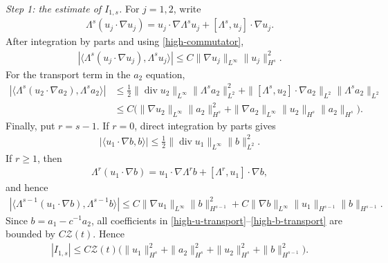 \documentclass[10pt,reqno]{amsart}
\numberwithin{equation}{section}
\begin{document}
\medskip
\noindent\emph{Step 1: the estimate of $I_{1,s}$.}
For $j=1,2$, write
\begin{align*}
\Lambda^s(u_j\cdot\nabla u_j)
=u_j\cdot\nabla\Lambda^su_j+[\Lambda^s,u_j]\cdot\nabla u_j.
\end{align*}
After integration by parts and using \eqref{high-commutator},
\begin{align}\label{high-u-transport}
\left|\langle\Lambda^s(u_j\cdot\nabla u_j),\Lambda^su_j\rangle\right|
\le C\|\nabla u_j\|_{L^\infty}\|u_j\|_{H^s}^2.
\end{align}
For the transport term in the $a_2$ equation,
\begin{align*}
 \left|\langle\Lambda^s(u_2\cdot\nabla a_2),\Lambda^sa_2\rangle\right| 
& \le \frac12\|\operatorname{div}u_2\|_{L^\infty}
\|\Lambda^sa_2\|_{L^2}^2
+\|[\Lambda^s,u_2]\cdot\nabla a_2\|_{L^2}\|\Lambda^sa_2\|_{L^2}\\
& \le C\big(\|\nabla u_2\|_{L^\infty}\|a_2\|_{H^s}^2
+\|\nabla a_2\|_{L^\infty}\|u_2\|_{H^s}\|a_2\|_{H^s}\big).
\end{align*}
Finally, put $r=s-1$.  If $r=0$, direct integration by parts gives
\begin{align*}
\left|\langle u_1\cdot\nabla b,b\rangle\right|
\le \frac12\|\operatorname{div}u_1\|_{L^\infty}\|b\|_{L^2}^2.
\end{align*}
If $r\ge1$, then
\begin{align*}
\Lambda^r(u_1\cdot\nabla b)
=u_1\cdot\nabla\Lambda^rb+[\Lambda^r,u_1]\cdot\nabla b,
\end{align*}
and hence
\begin{align}\label{high-b-transport}
\left|\langle\Lambda^{s-1}(u_1\cdot\nabla b),\Lambda^{s-1}b\rangle\right|
\le C\|\nabla u_1\|_{L^\infty}\|b\|_{H^{s-1}}^2
+C\|\nabla b\|_{L^\infty}\|u_1\|_{H^{s-1}}\|b\|_{H^{s-1}}.
\end{align}
Since $b=a_1-c^{-1}a_2$, all coefficients in
\eqref{high-u-transport}--\eqref{high-b-transport} are bounded by $C\mathcal Z(t)$.
Hence
\begin{align}\label{high-I1}
|I_{1,s}|\le C\mathcal Z(t)\Big(
\|u_1\|_{H^s}^2+\|a_2\|_{H^s}^2+\|u_2\|_{H^s}^2
+\|b\|_{H^{s-1}}^2\Big).
\end{align}
\end{document}
